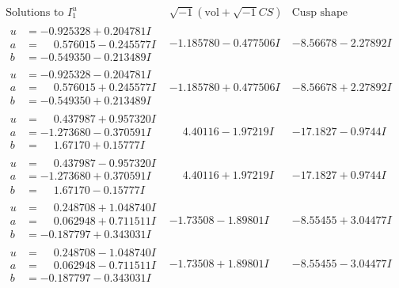 \documentclass[1p]{elsarticle_modified}
\theoremstyle{definition}
\newcommand{\I}{\sqrt{-1}}
\begin{document}
$$\begin{array}{c|c|c}  
\text{Solutions to }I^u_{1}& \I (\text{vol} + \sqrt{-1}CS) & \text{Cusp shape}\\
 \hline 
\begin{aligned}
u &= -0.925328 + 0.204781 I \\
a &= \phantom{-}0.576015 - 0.245577 I \\
b &= -0.549350 - 0.213489 I\end{aligned}
 & -1.185780 - 0.477506 I & -8.56678 - 2.27892 I \\ \hline\begin{aligned}
u &= -0.925328 - 0.204781 I \\
a &= \phantom{-}0.576015 + 0.245577 I \\
b &= -0.549350 + 0.213489 I\end{aligned}
 & -1.185780 + 0.477506 I & -8.56678 + 2.27892 I \\ \hline\begin{aligned}
u &= \phantom{-}0.437987 + 0.957320 I \\
a &= -1.273680 - 0.370591 I \\
b &= \phantom{-}1.67170 + 0.15777 I\end{aligned}
 & \phantom{-}4.40116 - 1.97219 I & -17.1827 - 0.9744 I \\ \hline\begin{aligned}
u &= \phantom{-}0.437987 - 0.957320 I \\
a &= -1.273680 + 0.370591 I \\
b &= \phantom{-}1.67170 - 0.15777 I\end{aligned}
 & \phantom{-}4.40116 + 1.97219 I & -17.1827 + 0.9744 I \\ \hline\begin{aligned}
u &= \phantom{-}0.248708 + 1.048740 I \\
a &= \phantom{-}0.062948 + 0.711511 I \\
b &= -0.187797 + 0.343031 I\end{aligned}
 & -1.73508 - 1.89801 I & -8.55455 + 3.04477 I \\ \hline\begin{aligned}
u &= \phantom{-}0.248708 - 1.048740 I \\
a &= \phantom{-}0.062948 - 0.711511 I \\
b &= -0.187797 - 0.343031 I\end{aligned}
 & -1.73508 + 1.89801 I & -8.55455 - 3.04477 I \\ \hline\begin{aligned}

\end{aligned}
\end{array}$$
\end{document}
